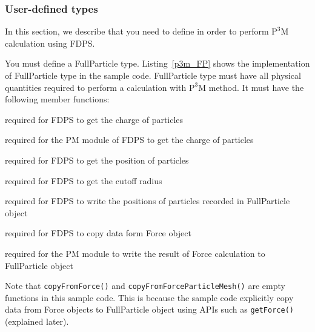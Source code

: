 \subsubsection{User-defined types}
In this section, we describe \structures that you need to define in order to perform $\mathrm{P^{3}M}$ calculation using FDPS.

You must define a \textsf{FullParticle} type. Listing~\ref{p3m_FP} shows the implementation of \textsf{FullParticle} type in the sample code. \textsf{FullParticle} type must have all physical quantities required to perform a calculation with $\mathrm{P^{3}M}$ method.
\ifCpp
It must have the following member functions:
\begin{description}[leftmargin=*,itemsep=-1ex,style=nextline]
\item[\texttt{getCharge()}] required for FDPS to get the charge of particles
\item[\texttt{getChargeParticleMesh()}] required for the \textsf{PM} module of FDPS to get the charge of particles
\item[\texttt{getPos()}] required for FDPS to get the position of particles
\item[\texttt{getRSearch()}] required for FDPS to get the cutoff radius
\item[\texttt{setPos()}] required for FDPS to write the positions of particles recorded in \textsf{FullParticle} object
\item[\texttt{copyFromForce()}] required for FDPS to copy data form \textsf{Force} object
\item[\texttt{copyFromForceParticleMesh()}] required for the \textsf{PM} module to write the result of Force calculation to \textsf{FullParticle} object
\end{description}
Note that \texttt{copyFromForce()} and \texttt{copyFromForceParticleMesh()} are empty functions in this sample code. This is because the sample code explicitly copy data from \textsf{Force} objects to \textsf{FullParticle} object using APIs such as \texttt{getForce()} (explained later). 
\endifCpp

\ifCpp

\endifCpp
\ifFtn

\endifFtn
\ifC

\endifC

